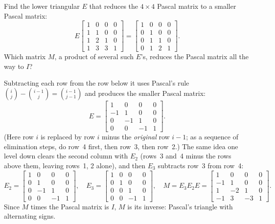 \begin{exercise}\label{ex:u03-pascal}
Find the lower triangular $E$ that reduces the $4\times4$ Pascal matrix to a smaller Pascal
matrix:
\[
  E\begin{bmatrix} 1&0&0&0\\ 1&1&0&0\\ 1&2&1&0\\ 1&3&3&1\end{bmatrix}
  =\begin{bmatrix} 1&0&0&0\\ 0&1&0&0\\ 0&1&1&0\\ 0&1&2&1\end{bmatrix}.
\]
Which matrix $M$, a product of several such $E$'s, reduces the Pascal matrix all the way to $I$?
\end{exercise}
\begin{solution}
Subtracting each row from the row below it uses Pascal's rule
$\binom{i}{j}-\binom{i-1}{j}=\binom{i-1}{j-1}$ and produces the smaller Pascal matrix:
\[
  E=\begin{bmatrix} 1&0&0&0\\ -1&1&0&0\\ 0&-1&1&0\\ 0&0&-1&1\end{bmatrix}.
\]
(Here row $i$ is replaced by row $i$ minus the \emph{original} row $i-1$; as a sequence of
elimination steps, do row~4 first, then row~3, then row~2.) The same idea one level down
clears the second column with $E_2$ (rows~3 and~4 minus the rows above them, leaving rows~1,
2 alone), and then $E_3$ subtracts row~3 from row~4:
\[
  E_2=\begin{bmatrix} 1&0&0&0\\ 0&1&0&0\\ 0&-1&1&0\\ 0&0&-1&1\end{bmatrix},\quad
  E_3=\begin{bmatrix} 1&0&0&0\\ 0&1&0&0\\ 0&0&1&0\\ 0&0&-1&1\end{bmatrix},\quad
  M=E_3E_2E=\begin{bmatrix} 1&0&0&0\\ -1&1&0&0\\ 1&-2&1&0\\ -1&3&-3&1\end{bmatrix}.
\]
Since $M$ times the Pascal matrix is $I$, $M$ is its inverse: Pascal's triangle with
alternating signs.
\end{solution}

